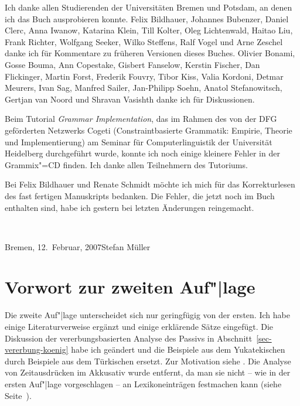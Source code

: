 Ich danke allen Studierenden der Universitäten Bremen und Potsdam, 
an denen ich das Buch ausprobieren konnte.
Felix Bildhauer,
Johannes Bubenzer, %
Daniel Clerc, %
Anna Iwanow, %
Katarina Klein, 
Till Kolter, 
Oleg Lichtenwald, 
Haitao Liu,
Frank Richter,
Wolfgang Seeker,
Wilko Steffens,
Ralf Vogel
und
Arne Zeschel
danke ich für Kommentare zu früheren Versionen dieses Buches.
Olivier Bonami, %
Gosse Bouma, 
Ann Copestake, 
Gisbert Fanselow, 
Kerstin Fischer, 
Dan Flickinger, 
Martin Forst,
Frederik Fouvry,
Tibor Kiss, 
Valia Kordoni, 
Detmar Meurers, 
Ivan Sag, 
Manfred Sailer,       %
Jan-Philipp Soehn,    %
Anatol Stefanowitsch,
Gertjan van Noord
und
Shravan Vasishth %
danke ich für Diskussionen.

Beim Tutorial \emph{Grammar Implementation}, das im Rahmen des von der DFG geförderten Netzwerks
Cogeti (Constraintbasierte Grammatik: Empirie, Theorie und Implementierung) am Seminar für
Computerlinguistik der Universität Heidelberg durchgeführt wurde,
konnte ich noch einige kleinere Fehler in der Grammix"=CD finden. Ich danke allen Teilnehmern des Tutoriums.

Bei Felix Bildhauer und Renate Schmidt möchte ich mich für das Korrekturlesen des fast fertigen
Manuskripts bedanken. Die Fehler, die jetzt noch im Buch enthalten sind, habe ich gestern bei
letzten Änderungen reingemacht.

~\medskip

\noindent
Bremen, 12.\ Februar, 2007\hfill Stefan Müller

\section*{Vorwort zur zweiten Auf"|lage}

Die zweite Auf"|lage unterscheidet sich nur geringfügig von der ersten. Ich habe einige
Literaturverweise ergänzt und einige erklärende Sätze eingefügt. Die Diskussion der
vererbungsbasierten Analyse des Passivs in Abschnitt~\ref{sec-vererbung-koenig} habe ich geändert und
die Beispiele aus dem Yukatekischen durch Beispiele aus dem Türkischen
ersetzt. Zur Motivation siehe . Die Analyse von Zeitausdrücken im
Akkusativ wurde entfernt, da man sie nicht -- wie in der ersten Auf"|lage vorgeschlagen -- an Lexikoneinträgen festmachen kann 
(siehe Seite~\pageref{bsp-den-groessten-Teil-der-Woche}).

